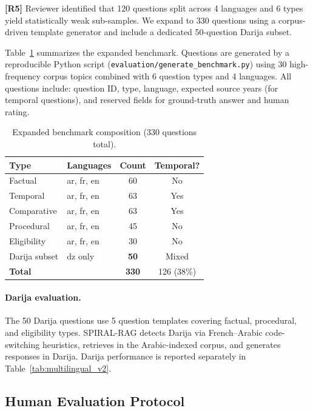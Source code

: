 \documentclass[12pt,a4paper]{article}
\newcommand{\response}[2]{%
  \vspace{4pt}
  \noindent\colorbox{yellow!20}{\parbox{\dimexpr\linewidth-2\fboxsep}{%
    \small\textbf{\color{revcolor}[R#1]} #2}}\vspace{4pt}}
\begin{document}
\response{5}{Reviewer identified that 120 questions split across 4 languages and
6 types yield statistically weak sub-samples. We expand to 330 questions using a
corpus-driven template generator and include a dedicated 50-question Darija
subset.}

Table~\ref{tab:benchmark_stats} summarizes the expanded benchmark. Questions are
generated by a reproducible Python script (\texttt{evaluation/generate\_benchmark.py})
using 30 high-frequency corpus topics combined with 6 question types and 4 languages.
All questions include: question ID, type, language, expected source years (for
temporal questions), and reserved fields for ground-truth answer and human rating.

\begin{table}[H]
\centering
\caption{Expanded benchmark composition (330 questions total).}
\label{tab:benchmark_stats}
\begin{tabular}{llcc}
\toprule
\textbf{Type} & \textbf{Languages} & \textbf{Count} & \textbf{Temporal?} \\
\midrule
Factual        & ar, fr, en  & 60  & No  \\
Temporal       & ar, fr, en  & 63  & Yes \\
Comparative    & ar, fr, en  & 63  & Yes \\
Procedural     & ar, fr, en  & 45  & No  \\
Eligibility    & ar, fr, en  & 30  & No  \\
Darija subset  & dz only     & \textbf{50}  & Mixed \\
\midrule
\textbf{Total} &             & \textbf{330} & 126 (38\%) \\
\bottomrule
\end{tabular}
\end{table}

\paragraph{Darija evaluation.}
The 50 Darija questions use 5 question templates covering factual, procedural,
and eligibility types. SPIRAL-RAG detects Darija via French–Arabic code-switching
heuristics, retrieves in the Arabic-indexed corpus, and generates responses in Darija.
Darija performance is reported separately in Table~\ref{tab:multilingual_v2}.

\subsection{Human Evaluation Protocol}
\label{sec:human_eval}
\end{document}
